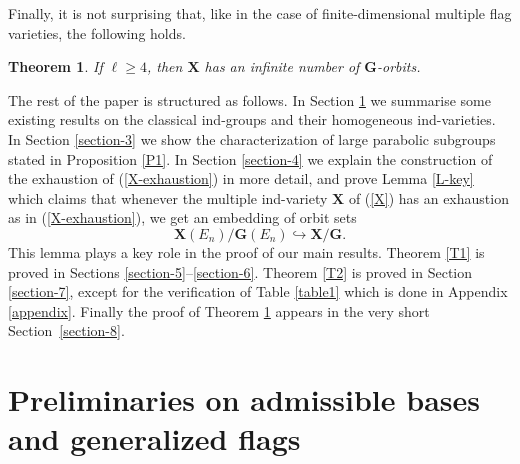 \documentclass[12pt]{amsart}
\newcommand{\G}{\mathbf{G}}
\renewcommand{\P}{\mathbf{P}}
\newcommand{\X}{\mathbf{X}}
\numberwithin{equation}{section}
\newtheorem{theorem}{Theorem}[section]
\theoremstyle{definition}
\begin{document}
\begin{table}[h]
\bigskip

\caption{Classification of triples $(\P_1,\P_2,\P_3)$, up to permutation, such that $\G/\P_1\times\G/\P_2\times\G/\P_3$ is of finite type.}
\label{table1}
\end{table}

\bigskip

Finally, it is not surprising that,  like in the case of finite-dimensional multiple flag varieties, the following holds.

\begin{theorem}
\label{T3}
If $\ell\geq 4$, then $\X$ has an infinite number of $\G$-orbits.
\end{theorem}

The rest of the paper is structured as follows.
In Section \ref{S2} we summarise some existing results on the classical ind-groups and their homogeneous ind-varieties.  
In Section \ref{section-3} we show the characterization of large parabolic subgroups stated in Proposition \ref{P1}.
In Section \ref{section-4} we explain the construction of the exhaustion of (\ref{X-exhaustion})
 in more detail, and prove Lemma \ref{L-key}
which claims that whenever the multiple ind-variety $\X$ of (\ref{X}) has an exhaustion as in (\ref{X-exhaustion}),
we get an embedding of orbit sets
\[
\X(E_n)/\G(E_n)\hookrightarrow \X/\G.
\]
This lemma plays a key role in the proof of our main results.
Theorem \ref{T1} is proved in Sections \ref{section-5}--\ref{section-6}. 
Theorem \ref{T2} is proved in Section \ref{section-7}, except for the verification of Table \ref{table1} which is done in Appendix \ref{appendix}.
Finally the proof of Theorem \ref{T3} appears in the very short Section~\ref{section-8}.



\section{Preliminaries on admissible bases and generalized flags}

\label{S2}

\end{document}
